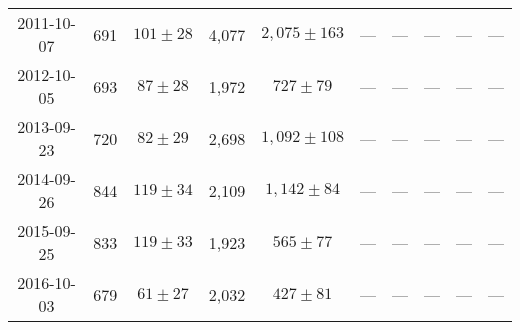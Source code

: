 \begin{landscape}
\begin{longtable}{cccccccccc}
{2011-10-07} & 691 & {$101  \pm  28$} & 4,077 & {$2,075 \pm 163$} & --- & --- & --- & --- & --- \\
{2012-10-05} & 693 & {$87  \pm  28$} & 1,972 & {$727 \pm 79$} & --- & --- & --- & --- & --- \\
{2013-09-23} & 720 & {$82  \pm  29$} & 2,698 & {$1,092 \pm 108$} & --- & --- & --- & --- & --- \\
{2014-09-26} & 844 & {$119  \pm  34$} & 2,109 & {$1,142 \pm 84$} & --- & --- & --- & --- & --- \\
{2015-09-25} & 833 & {$119  \pm  33$} & 1,923 & {$565 \pm 77$} & --- & --- & --- & --- & --- \\
{2016-10-03} & 679 & {$61  \pm  27$} & 2,032 & {$427 \pm 81$} & --- & --- & --- & --- & --- \\
\end{longtable} 
\end{landscape} 
